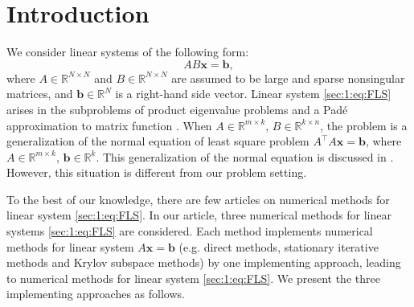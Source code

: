 \section{Introduction}\label{sec:1}
We consider linear systems of the following form:
%
\begin{equation}\label{sec:1:eq:FLS}
    AB\boldsymbol{x}= \boldsymbol{b},
\end{equation}
%
where $A\in \mathbb{R}^{N\times N}$ and $B\in \mathbb{R}^{N\times N}$ are assumed to be large and sparse nonsingular matrices, and $\boldsymbol{b} \in \mathbb{R}^N$ is a right-hand side vector. Linear system \eqref{sec:1:eq:FLS}  arises in the subproblems of product eigenvalue problems \cite{WA05} and a Pad\'e approximation to matrix function \cite[p.204]{SO23}. When $A\in \mathbb{R}^{m \times k}$, $B \in \mathbb{R}^{k \times n}$, the problem is a generalization of the normal
equation of least square problem $A^\top A\boldsymbol{x}=\boldsymbol{b}$, where $A\in \mathbb{R}^{m\times k}$, $\boldsymbol{b}\in \mathbb{R}^{k}$. This generalization of the normal equation is discussed in \cite{DU24}. However, this situation is different from our problem setting.
\par
To the best of our knowledge, there are few articles on numerical methods for linear system \eqref{sec:1:eq:FLS}. In our article, three numerical methods for linear systems \eqref{sec:1:eq:FLS} are considered.  Each method implements numerical methods for linear system $A\boldsymbol{x}=\boldsymbol{b}$ (e.g. direct methods, stationary iterative methods and Krylov subspace methods) by one implementing approach, leading to numerical methods for linear system \eqref{sec:1:eq:FLS}. We present the
three implementing approaches as follows.

